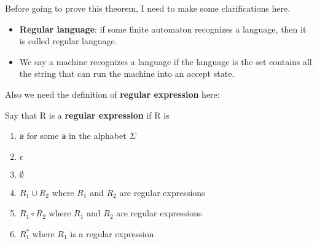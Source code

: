 \begin{note}
    Before going to prove this theorem, I need to make some clarifications here.

    \begin{itemize}
        \item \textbf{Regular language}: if some finite automaton recognizes a language, then it is called regular language.
        \item We say a machine recognizes a language if the language is the set contains all the string that can run the machine into an accept state.
    \end{itemize}

    Also we need the definition of \textbf{regular expression} here:
    \begin{definition}
        Say that R is a \textbf{regular expression} if R is
        \begin{enumerate}
            \item \verb|a| for some \verb|a| in the alphabet \(\Sigma\) 
            \item \(\epsilon\)
            \item \(\emptyset\)
            \item \(R_1 \cup R_2\) where \(R_1\) and \(R_2\) are regular expressions
            \item \(R_1 \circ R_2\) where \(R_1\) and \(R_2\) are regular expressions
            \item \(R_1^*\) where \(R_1\) is a regular expression         
        \end{enumerate} 
    \end{definition}
\end{note}


